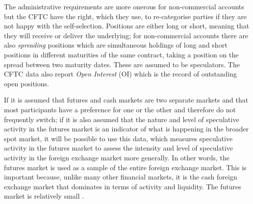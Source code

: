 \documentclass[12pt, a4paper, oneside]{article} %
\begin{document}
The administrative requirements are more onerous for non-commercial accounts but the CFTC have the right, which they use, to re-categorise parties if they are not happy with the self-selection.  Positions are either long or short, meaning that they will receive or deliver the underlying; for non-commercial accounts there are also \emph{spreading} positions which are simultaneous holdings of long and short positions in different maturities of the same contract, taking a position on the spread between two maturity dates.  These are assumed to be speculators.  The CFTC data also report \emph{Open Interest} (OI) which is the record of outstanding open positions.   

If it is assumed that futures and cash markets are two separate markets and that most participants have a preference for one or the other and therefore do not frequently switch; if it is also assumed that the nature and level of speculative activity in the futures market is an indicator of what is happening in the broader spot market, it will be possible to use this data, which measures speculative activity in the futures market to assess the intensity and level of speculative activity in the foreign exchange market more generally.  In other words, the futures market is used as a sample of the entire foreign exchange market. This is important because, unlike many other financial markets, it is the cash foreign exchange market that dominates in terms of activity and liquidity.  The futures market is relatively small \citep{BISFX}. 

\end{document}
